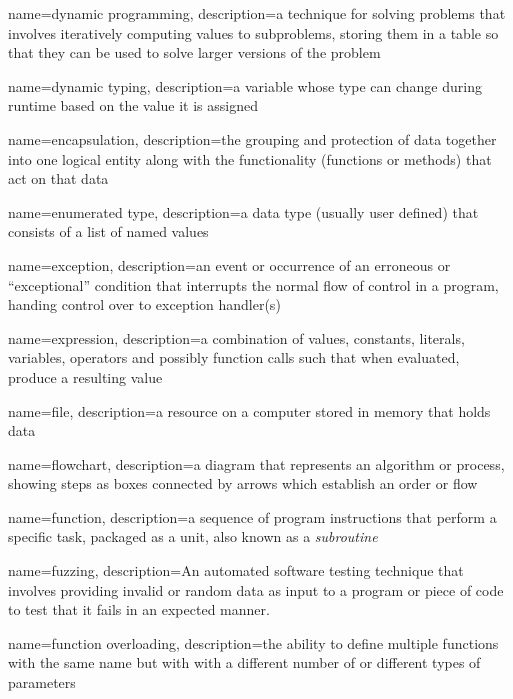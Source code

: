 {
  name=dynamic programming,
  description={a technique for solving problems that involves iteratively computing values to subproblems, storing them in a table so that they can be used to solve larger versions of the problem}
}

{
  name=dynamic typing,
  description={a variable whose type can change during runtime based on the value it is assigned}
}

{
  name=encapsulation,
  description={the grouping and protection of data together into one logical entity along with the functionality (functions or methods)
  	that act on that data}
}

{
  name=enumerated type,
  description={a data type (usually user defined) that consists of a list of named values}
}

{
  name=exception,
  description={an event or occurrence of an erroneous or ``exceptional'' condition that interrupts the normal flow of control in a program, handing control over to exception handler(s)}
}

{
  name=expression,
  description={a combination of values, constants, literals, variables, operators and possibly function calls such that when evaluated, produce a resulting value}
}

{
  name=file,
  description={a resource on a computer stored in memory that holds data}
}

{
  name=flowchart,
  description={a diagram that represents an algorithm or process, showing steps as boxes connected by arrows which establish an
  order or flow}
}

{
  name=function,
  description={a sequence of program instructions that perform a specific task, packaged as a unit, also
  known as a \emph{subroutine}}
}

{
  name=fuzzing,
  description={An automated software testing technique that involves providing invalid or random data as input to a program or piece of code to test that it fails in an expected manner.}
}

{
  name=function overloading,
  description={the ability to define multiple functions with the same name but with with a different number of or different types of parameters}
}

